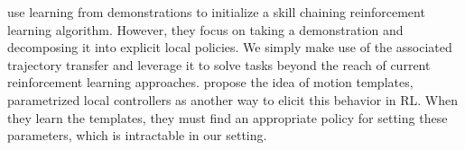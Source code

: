 \citet{konidaris2010constructing} use learning from demonstrations to initialize a skill chaining reinforcement learning algorithm.
However, they focus on taking a demonstration and decomposing it into explicit local policies.
We simply make use of the associated trajectory transfer and leverage it to solve tasks beyond the reach of current reinforcement learning approaches.
\citet{Neumann09learningcomplex} propose the idea of motion templates, parametrized local controllers as another way to elicit this behavior in RL.
When they learn the templates, they must find an appropriate policy for setting these parameters, which is intractable in our setting.
